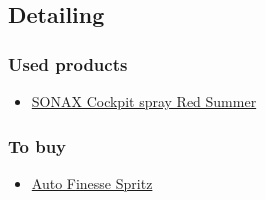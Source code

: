 \documentclass[12pt, a4paper, portrait]{article}
\begin{document}
\subsection{Detailing}
\subsubsection{Used products}
\begin{itemize}
\item{\href{https://www.sonax.com/Product-Search/(location)/21031-SONAX-Cockpit-spray-Red-Summer}{SONAX Cockpit spray Red Summer}}
\end{itemize}
\subsubsection{To buy}
\begin{itemize}
\item{\href{https://shop.autofinesse.co.uk/spritz-500ml}{Auto Finesse Spritz}}
\end{itemize}
\end{document}
